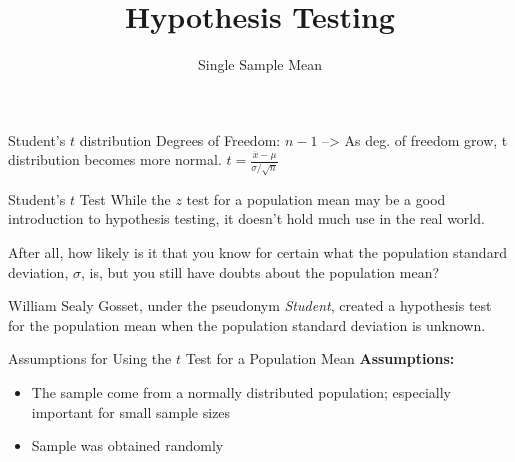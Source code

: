 \documentclass[t]{beamer}
\title{Hypothesis Testing}
\subtitle{Single Sample Mean}
\author{}
\date{}
\begin{document}

\begin{frame} 
\maketitle
\end{frame}

\begin{frame}
Student's $t$ distribution
Degrees of Freedom: $n-1$ --> As deg. of freedom grow, t distribution becomes more normal.
$t = \frac{\overline{x}-\mu}{\sigma/\sqrt{n}}$

\end{frame}

\begin{frame}{Student's $t$ Test}
While the $z$ test for a population mean may be a good introduction to hypothesis testing, it doesn't hold much use in the real world. \newline\\	\pause

After all, how likely is it that you know for certain what the population standard deviation, $\sigma$, is, but you still have doubts about the population mean?	\newline\\	\pause

William Sealy Gosset, under the pseudonym \textit{Student}, created a hypothesis test for the population mean when the population standard deviation is unknown.
\end{frame}

\begin{frame}{Assumptions for Using the $t$ Test for a Population Mean}
\textbf{Assumptions:} 
\begin{itemize}
	\item<2-> The sample come from a normally distributed population; especially important for small sample sizes
	\item<3-> Sample was obtained randomly
\end{itemize}
\end{frame}
\end{document}
